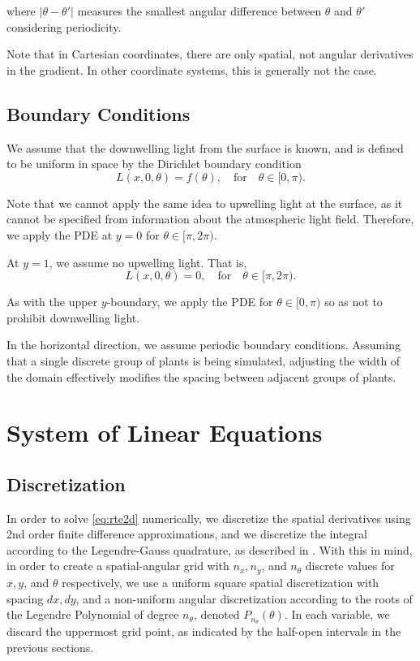 \documentclass[10pt]{article}
\newcommand\abs[1]{\left| #1 \right|}
\begin{document}
\begin{multicols}{2}
where $\abs{\theta-\theta'}$ measures the smallest angular difference between $\theta$ and $\theta'$ considering periodicity.

Note that in Cartesian coordinates, there are only spatial, not angular derivatives in the gradient.
In other coordinate systems, this is generally not the case.

\subsection{Boundary Conditions}
We assume that the downwelling light from the surface is known, and is defined to be uniform in space by the Dirichlet boundary condition
\begin{equation}
    L(x,0,\theta) = f(\theta), \quad \mbox{for} \quad \theta \in [0,\pi).
    \label{eq:surf_bc}
\end{equation}

Note that we cannot apply the same idea to upwelling light at the surface, as it cannot be specified from information about the atmospheric light field.
Therefore, we apply the PDE at $y=0$ for $\theta \in [\pi,2\pi)$.

At $y=1$, we assume no upwelling light.
That is,
\begin{equation}
    L(x,0,\theta) = 0, \quad \mbox{for} \quad \theta \in [\pi,2\pi).
    \label{eq:bottom_bc}
\end{equation}

As with the upper $y$-boundary, we apply the PDE for $\theta \in [0,\pi)$ so as not to prohibit downwelling light.

In the horizontal direction, we assume periodic boundary conditions.
Assuming that a single discrete group of plants is being simulated, adjusting the width of the domain effectively modifies the spacing between adjacent groups of plants.

\section{System of Linear Equations}

\subsection{Discretization}
In order to solve \eqref{eq:rte2d} numerically, we discretize the spatial derivatives using 2nd order finite difference approximations, and we discretize the integral according to the Legendre-Gauss quadrature, as described in \citet[Chapter 2]{chandrasekhar_radiative_1960}.
With this in mind, in order to create a spatial-angular grid with $n_x,n_y$, and $n_\theta$ discrete values for $x, y$, and $\theta$ respectively, we use a uniform square spatial discretization with spacing $dx, dy$, and a non-uniform angular discretization according to the roots of the Legendre Polynomial of degree $n_\theta$, denoted $P_{n_\theta}(\theta)$.
In each variable, we discard the uppermost grid point, as indicated by the half-open intervals in the previous sections.


\end{multicols}
\end{document}
